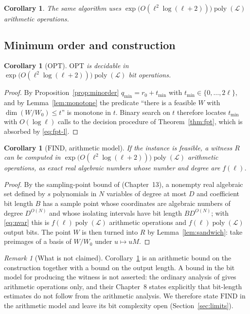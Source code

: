 \documentclass[journal]{IEEEtran}
\theoremstyle{plainn}
\newtheorem{cor}[thm]{Corollary}
\theoremstyle{remark}
\newtheorem{remark}{Remark}
\begin{document}
\begin{cor}\label{cor:arith}
The same algorithm uses $\exp\bigl(O(\ell^2\log(\ell+2))\bigr)\operatorname{poly}(\mathcal L)$
arithmetic operations.
\end{cor}

\subsection{Minimum order and construction}\label{sec:optfind}

\begin{cor}[$\mathrm{OPT}$]\label{cor:opt}
$\mathrm{OPT}$ is decidable in $\exp\bigl(O(\ell^2\log(\ell+2))\bigr)\operatorname{poly}(\mathcal L)$
bit operations.
\end{cor}

\begin{proof}
By Proposition~\ref{prop:minorder} $q_{\min}=r_0+t_{\min}$ with $t_{\min}\in\{0,\dots,2\ell\}$, and
by Lemma~\ref{lem:monotone} the predicate ``there is a feasible $W$ with
$\dim(W/W_0)\le t$'' is monotone in $t$. Binary search on $t$ therefore locates $t_{\min}$ with
$O(\log\ell)$ calls to the decision procedure of Theorem~\ref{thm:fpt}, which is absorbed by
\eqref{eq:fpt-l}.
\end{proof}

\begin{cor}[$\mathrm{FIND}$, arithmetic model]\label{cor:find}
If the instance is feasible, a witness $R$ can be computed in
$\exp\bigl(O(\ell^2\log(\ell+2))\bigr)\operatorname{poly}(\mathcal L)$ arithmetic operations, as
exact real algebraic numbers whose number and degree are $f(\ell)$.
\end{cor}

\begin{proof}
By the sampling-point bound of \cite{bpr06} (Chapter~13), a nonempty real algebraic set defined by
$s$ polynomials in $N$ variables of degree at most $D$ and coefficient bit length $B$ has a sample
point whose coordinates are algebraic numbers of degree $D^{O(N)}$ and whose isolating intervals
have bit length $B D^{O(N)}$; with \eqref{eq:nvar} this is $f(\ell)\operatorname{poly}(\mathcal
L)$ arithmetic operations and $f(\ell)\operatorname{poly}(\mathcal L)$ output bits. The point $W$
is then turned into $R$ by Lemma~\ref{lem:sandwich}: take preimages of a basis of $W/W_0$ under
$u\mapsto uM$.
\end{proof}

\begin{remark}[What is not claimed]\label{rem:find-bit}
Corollary~\ref{cor:find} is an arithmetic bound on the construction together with a bound on the
output length. A bound in the bit model for producing the witness is not asserted: the ordinary
analysis of \cite{bpr06} gives arithmetic operations only, and their Chapter~8 states explicitly
that bit-length estimates do not follow from the arithmetic analysis. We therefore state
$\mathrm{FIND}$ in the arithmetic model and leave its bit complexity open
(Section~\ref{sec:limits}).
\end{remark}
\end{document}
